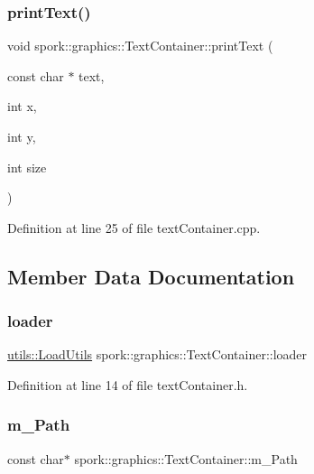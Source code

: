 \subsubsection{\texorpdfstring{print\+Text()}{printText()}}
{\footnotesize\ttfamily void spork\+::graphics\+::\+Text\+Container\+::print\+Text (\begin{DoxyParamCaption}\item[{const char $\ast$}]{text,  }\item[{int}]{x,  }\item[{int}]{y,  }\item[{int}]{size }\end{DoxyParamCaption})}



Definition at line 25 of file text\+Container.\+cpp.



\subsection{Member Data Documentation}
\mbox{\label{classspork_1_1graphics_1_1_text_container_a32e7f7af04cf6aab22a462a0a1763111}} 
\subsubsection{\texorpdfstring{loader}{loader}}
{\footnotesize\ttfamily \hyperlink{classspork_1_1utils_1_1_load_utils}{utils\+::\+Load\+Utils} spork\+::graphics\+::\+Text\+Container\+::loader}



Definition at line 14 of file text\+Container.\+h.

\mbox{\label{classspork_1_1graphics_1_1_text_container_a4b36fa27b2b511ac8444e00c5474b38b}} 
\subsubsection{\texorpdfstring{m\+\_\+\+Path}{m\_Path}}
{\footnotesize\ttfamily const char$\ast$ spork\+::graphics\+::\+Text\+Container\+::m\+\_\+\+Path\hspace{0.3cm}{\ttfamily [private]}}



